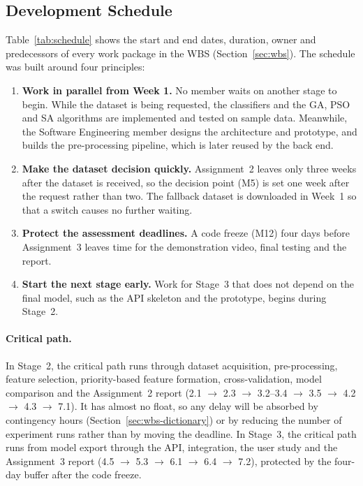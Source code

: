 \subsection{Development Schedule}\label{sec:schedule}

Table~\ref{tab:schedule} shows the start and end dates, duration, owner and predecessors of every work package in the WBS (Section~\ref{sec:wbs}). The schedule was built around four principles:

\begin{enumerate}[nosep]
  \item \textbf{Work in parallel from Week 1.} No member waits on another stage to begin. While the dataset is being requested, the classifiers and the GA, PSO and SA algorithms are implemented and tested on sample data. Meanwhile, the Software Engineering member designs the architecture and prototype, and builds the pre-processing pipeline, which is later reused by the back end.
  \item \textbf{Make the dataset decision quickly.} Assignment~2 leaves only three weeks after the dataset is received, so the decision point (M5) is set one week after the request rather than two. The fallback dataset is downloaded in Week~1 so that a switch causes no further waiting.
  \item \textbf{Protect the assessment deadlines.} A code freeze (M12) four days before Assignment~3 leaves time for the demonstration video, final testing and the report.
  \item \textbf{Start the next stage early.} Work for Stage~3 that does not depend on the final model, such as the API skeleton and the prototype, begins during Stage~2.
\end{enumerate}

\paragraph{Critical path.} In Stage~2, the critical path runs through dataset acquisition, pre-processing, feature selection, priority-based feature formation, cross-validation, model comparison and the Assignment~2 report (2.1 $\rightarrow$ 2.3 $\rightarrow$ 3.2--3.4 $\rightarrow$ 3.5 $\rightarrow$ 4.2 $\rightarrow$ 4.3 $\rightarrow$ 7.1). It has almost no float, so any delay will be absorbed by contingency hours (Section~\ref{sec:wbs-dictionary}) or by reducing the number of experiment runs rather than by moving the deadline. In Stage~3, the critical path runs from model export through the API, integration, the user study and the Assignment~3 report (4.5 $\rightarrow$ 5.3 $\rightarrow$ 6.1 $\rightarrow$ 6.4 $\rightarrow$ 7.2), protected by the four-day buffer after the code freeze.

